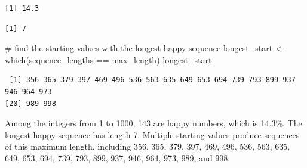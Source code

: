 \documentclass[
  letterpaper,
  DIV=11,
  numbers=noendperiod]{scrartcl}
\newenvironment{Shaded}{\begin{snugshade}}{\end{snugshade}}
\newcommand{\AttributeTok}[1]{\textcolor[rgb]{0.40,0.45,0.13}{#1}}
\newcommand{\CommentTok}[1]{\textcolor[rgb]{0.37,0.37,0.37}{#1}}
\newcommand{\ConstantTok}[1]{\textcolor[rgb]{0.56,0.35,0.01}{#1}}
\newcommand{\ControlFlowTok}[1]{\textcolor[rgb]{0.00,0.23,0.31}{\textbf{#1}}}
\newcommand{\FunctionTok}[1]{\textcolor[rgb]{0.28,0.35,0.67}{#1}}
\newcommand{\NormalTok}[1]{\textcolor[rgb]{0.00,0.23,0.31}{#1}}
\newcommand{\OtherTok}[1]{\textcolor[rgb]{0.00,0.23,0.31}{#1}}
\newcommand{\SpecialCharTok}[1]{\textcolor[rgb]{0.37,0.37,0.37}{#1}}
\begin{document}
\begin{verbatim}
[1] 14.3
\end{verbatim}

\begin{Shaded}
\end{Shaded}

\begin{verbatim}
[1] 7
\end{verbatim}

\begin{Shaded}
\begin{Highlighting}[]
\CommentTok{\# find the starting values with the longest happy sequence}
\NormalTok{longest\_start }\OtherTok{\textless{}{-}} \FunctionTok{which}\NormalTok{(sequence\_lengths }\SpecialCharTok{==}\NormalTok{ max\_length)}
\NormalTok{longest\_start}
\end{Highlighting}
\end{Shaded}

\begin{verbatim}
 [1] 356 365 379 397 469 496 536 563 635 649 653 694 739 793 899 937 946 964 973
[20] 989 998
\end{verbatim}

Among the integers from 1 to 1000, 143 are happy numbers, which is
14.3\%. The longest happy sequence has length 7. Multiple starting
values produce sequences of this maximum length, including 356, 365,
379, 397, 469, 496, 536, 563, 635, 649, 653, 694, 739, 793, 899, 937,
946, 964, 973, 989, and 998.
\end{document}
